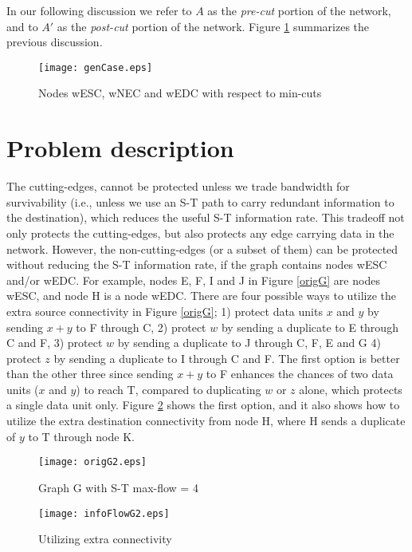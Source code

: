 \documentclass[conference]{IEEEtran}
\begin{document}
In our following discussion we refer to $A$ as the \emph{pre-cut} portion of the network, and to $A'$ as the \emph{post-cut} portion of the network. Figure \ref{genCase} summarizes the previous discussion.

\begin{figure}[tbh]
\centering
\texttt{[image: genCase.eps]}
\caption{Nodes wESC, wNEC and wEDC with respect to min-cuts}
\label{genCase}
\end{figure}



\section{Problem description}
\label{Sec:problem}

The cutting-edges, cannot be protected unless we trade bandwidth for survivability (i.e., unless we use an S-T path to carry redundant information to the destination), which reduces the useful S-T information rate. This tradeoff not only protects the cutting-edges, but also protects any edge carrying data in the network. However, the non-cutting-edges (or a subset of them) can be protected without reducing the S-T information rate, if the graph contains nodes wESC and/or wEDC. For example, nodes E, F, I and J in Figure \ref{origG} are nodes wESC, and node H is a node wEDC. There are four possible ways to utilize the extra source connectivity in Figure \ref{origG}; 1) protect data units $x$ and $y$ by sending $x+y$ to F through C, 2) protect $w$ by sending a duplicate to E through C and F, 3) protect $w$ by sending a duplicate to J through C, F, E and G 4) protect $z$ by sending a duplicate to I through C and F. The first option is better than the other three since sending $x+y$ to F enhances the chances of two data units ($x$ and $y$) to reach T, compared to duplicating $w$ or $z$ alone, which protects a single data unit only. Figure \ref{infoFlowG} shows the first option, and it also shows how to utilize the extra destination connectivity from node H, where H sends a duplicate of $y$ to T through node K.



\begin{figure}[tbh]
\begin{minipage}[b]{0.3\linewidth}
\centering
\texttt{[image: origG2.eps]}
\caption{Graph G with S-T max-flow = 4}
\label{origG}
\end{minipage}
\hspace{1.5cm}
\begin{minipage}[b]{0.3\linewidth}
\centering
\texttt{[image: infoFlowG2.eps]}
\caption{Utilizing extra connectivity}
\label{infoFlowG}
\end{minipage}
\end{figure}
\end{document}
